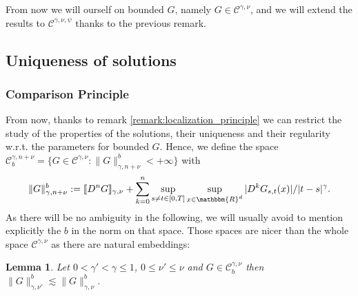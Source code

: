 \documentclass[a4paper,11pt]{article}
\newcommand{\assign}{:=}
\newtheorem{lemma}[theorem]{Lemma}
\newcommand{\CC}{\mathscr C}
\begin{document}
From now we will ourself on bounded $G$, namely $G \in \CC^{\gamma , \nu}$,
and we will extend the results to $\CC^{\gamma , \nu , \psi}$ thanks to the
previous remark.

\subsection{Uniqueness of solutions}\label{subsec:uniqueness}

\subsubsection{Comparison Principle}\label{subsec:comparison_principle}

From now, thanks to remark \ref{remark:localization_principle} we can restrict
the study of the properties of the solutions, their uniqueness and their
regularity w.r.t. the parameters for bounded $G$. Hence, we define the
 space
$ \CC^{\gamma ,n+ \nu}_{b} = \{ G \in \CC^{\gamma , \nu} : \| G
   \|^{b}_{\gamma ,n+ \nu} <+ \infty
   \} $
   with $$
   \| G
   \|^{b}_{\gamma ,n+ \nu} \assign \llbracket D^{n} G \rrbracket_{\gamma ,
   \nu} + \sum_{k=0}^{n} \sup_{s \neq t \in [ 0,T ]} \sup_{x \in
   \mathbbm{R}^{d}} | D^{k} G_{s,t} ( x ) | / | t-s |^{\gamma}.
   $$
As there will be no ambiguity in the following, we will usually avoid to
mention explicitly the $b$ in the norm on that space. Those spaces are nicer
than the whole space $\CC^{\gamma , \nu}$ as there are natural embeddings:

\begin{lemma}
  \label{lemma:embedding}Let $0< \gamma' < \gamma \leqslant 1$, $0 \leqslant
  \nu' \leqslant \nu$ and $G \in \CC^{\gamma , \nu}_{b}$ then
  $ \| G \|^{b}_{\gamma , \nu'} \lesssim \| G \|_{\gamma , \nu}^{b} $.
  \end{lemma}
\end{document}
